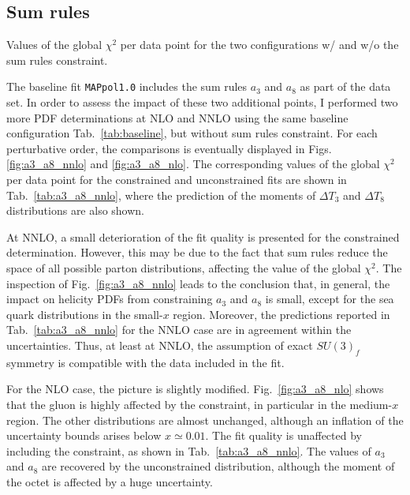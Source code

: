 \subsection*{Sum rules}

\begin{table}
  \centering
  \small
  
  \caption{
    \small
    Values of the global $\chi^2$ per data point for the two configurations w/ and w/o the sum rules constraint.
  \label{tab:a3_a8_nnlo}}
\end{table}

The baseline fit \texttt{MAPpol1.0} includes the sum rules $a_3$ and $a_8$ as part of the data set. In order to assess the impact of these two additional points, I performed two more PDF determinations at NLO and NNLO using the same baseline configuration Tab.~\ref{tab:baseline}, but without sum rules constraint. For each perturbative order, the comparisons is eventually displayed in Figs.\ref{fig:a3_a8_nnlo} and \ref{fig:a3_a8_nlo}. The corresponding values of the global $\chi^2$ per data point for the constrained and unconstrained fits are shown in Tab.~\ref{tab:a3_a8_nnlo}, where the prediction of the moments of $\Delta T_3$ and $\Delta T_8$ distributions are also shown.%

At NNLO, a small deterioration of the fit quality is presented for the constrained determination. However, this may be due to the fact that sum rules reduce the space of all possible parton distributions, affecting the value of the global $\chi^2$. The inspection of Fig.~\ref{fig:a3_a8_nnlo} leads to the conclusion that, in general, the impact on helicity PDFs from constraining $a_3$ and $a_8$ is small, except for the sea quark distributions in the small-$x$ region. Moreover, the predictions reported in Tab.~\ref{tab:a3_a8_nnlo} for the NNLO case are in agreement within the uncertainties. Thus, at least at NNLO, the assumption of exact $SU(3)_f$ symmetry is compatible with the data included in the fit.%

For the NLO case, the picture is slightly modified. Fig.~\ref{fig:a3_a8_nlo} shows that the gluon is highly affected by the constraint, in particular in the medium-$x$ region. The other distributions are almost unchanged, although an inflation of the uncertainty bounds arises below $x \simeq 0.01$. The fit quality is unaffected by including the constraint, as shown in Tab.~\ref{tab:a3_a8_nnlo}. The values of $a_3$ and $a_8$ are recovered by the unconstrained distribution, although the moment of the octet is affected by a huge uncertainty.%

